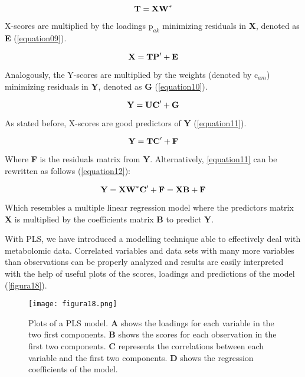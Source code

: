 \begin{equation}
\label{equation08}
\textbf{\text{T}}=\textbf{\text{XW}}^*
\end{equation}

X-scores are multiplied by the loadings $\text{p}_{ak}$ minimizing residuals in \textbf{X}, denoted as \textbf{E} (\autoref{equation09}).

\begin{equation}
\label{equation09}
\textbf{\text{X}}=\textbf{\text{TP}}'+\textbf{\text{E}}
\end{equation}

Analogously, the Y-scores are multiplied by the weights (denoted by $\text{c}_{am}$) minimizing residuals in \textbf{Y}, denoted as \textbf{G} (\autoref{equation10}).

\begin{equation}
\label{equation10}
\textbf{\text{Y}}=\textbf{\text{UC}}'+\textbf{\text{G}}
\end{equation}

As stated before, X-scores are good predictors of \textbf{Y} (\autoref{equation11}).

\begin{equation}
\label{equation11}
\textbf{\text{Y}}=\textbf{\text{TC}}'+\textbf{\text{F}}
\end{equation}

Where \textbf{F} is the residuals matrix from \textbf{Y}. Alternatively, \autoref{equation11} can be rewritten as follows (\autoref{equation12}):

\begin{equation}
\label{equation12}
\textbf{\text{Y}}=\textbf{\text{XW}}^*\textbf{\text{C}}'+\textbf{\text{F}}=\textbf{\text{XB}}+\textbf{\text{F}}
\end{equation}

Which resembles a multiple linear regression model where the predictors matrix \textbf{X} is multiplied by the coefficients matrix \textbf{B} to predict \textbf{Y}.

With PLS, we have introduced a modelling technique able to effectively deal with metabolomic data. Correlated variables and data sets with many more variables than observations can be properly analyzed and results are easily interpreted with the help of useful plots of the scores, loadings and predictions of the model (\autoref{figura18}).

\begin{figure}[hbtp]
	\centering
\texttt{[image: figura18.png]}
\caption{Plots of a PLS model. \textbf{A} shows the loadings for each variable in the two first components. \textbf{B} shows the scores for each observation in the first two components. \textbf{C} represents the correlations between each variable and the first two components.  \textbf{D} shows the regression coefficients of the model.}
\label{figura18}
\end{figure}


